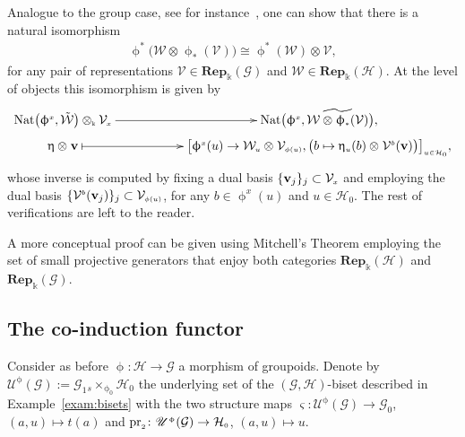 \documentclass[pdftex]{sigma}
\numberwithin{equation}{section}
\newcommand{\tensor}[1]{\otimes_{\scriptscriptstyle{#1}}}
\newcommand{\Rep}[1]{\mathbf{Rep}_{\Sscript{\Bbbk}}(#1)}
\newcommand{\Go}{\cG_{\Sscript{0}}}
\newcommand{\Ga}{\cG_{\Sscript{1}}}
\newcommand{\Ho}{\cH_{\Sscript{0}}}
\newcommand{\Vx}{\cV_{\Sscript{x}}}
\newcommand{\uU}{\mathscr{U}}
\newcommand{\cG}{{\mathcal G}}
\newcommand{\cH}{{\mathcal H}}
\newcommand{\cV}{{\mathcal V}}
\newcommand{\cW}{{\mathcal W}}
\newcommand{\Sscript}[1]{\scriptscriptstyle{#1}}
\newcommand{\due}[3]{{}_{{#2 }} {#1}_{{ #3}} }
\newcommand{\upg}{\uU^{\Sscript{\upphi}}(\cG)}
\begin{document}
\begin{Remark}\label{rem:PFromula}Analogue to the group case, see for instance~\cite[Proposition~2.10.18]{Kowalski:2014}, one can show that there is a natural isomorphism
\begin{gather*}
\upphi^{\Sscript{*}}\big( \cW \tensor{}\upphi_{\Sscript{*}}(\cV)\big) \cong \upphi^{\Sscript{*}}(\cW)\tensor{} \cV,
\end{gather*}
for any pair of representations $\cV \in \Rep{\cG}$ and $\cW \in \Rep{\cH}$. At the level of objects this isomorphism is given by
\begin{gather*}
\xymatrix@R=0pt{ {\rm Nat}\big(\upphi^{\Sscript{x}}, \tilde{\cW}\big) \tensor{\Bbbk} \Vx \ar@{->}^-{}[rr] & & {\rm Nat}\big(\upphi^{\Sscript{x}}, \widetilde{\cW
\tensor{}\upphi_{\Sscript{*}}(\cV)}\big), \\ \upeta\tensor{} {\bf{v}} \ar@{|->}^-{}[rr] & & \big[ \upphi^{\Sscript{x}}(u) \to \cW_{\Sscript{u}}\tensor{}\cV_{\Sscript{\phi(u)}}, \big( b \mapsto \upeta_{\Sscript{u}}(b)\tensor{}\cV^{\Sscript{b}}({\bf{v}})\big) \big]_{\Sscript{u \in \Ho}}, }
\end{gather*}
whose inverse is computed by fixing a dual basis $\{{\bf{v}}_j\}_{j} \subset \Vx$ and employing the dual basis $\{\cV^{\Sscript{b}}({\bf{v}}_j)\}_{j} \subset \cV_{\Sscript{\phi(u)}}$, for any $b \in \upphi^{\Sscript{x}}(u)$ and $u \in \Ho$. The rest of verifications are left to the reader.

A more conceptual proof can be given using Mitchell's Theorem \cite[Theorem 4.5.2]{Mitchell:1965} employing the set of small projective generators that enjoy both categories $\Rep{\cH}$ and $\Rep{\cG}$.
\end{Remark}

\subsection{The co-induction functor}\label{ssec:coInd}
Consider as before $\upphi\colon \cH \to \cG$ a morphism of groupoids. Denote by $\upg:=\Ga \due \times {\Sscript{s}}{ \Sscript{\upphi_0} } \Ho$ the underlying set of the $(\cG,\cH)$-biset described in Example~\ref{exam:bisets} with the two structure maps $ \varsigma\colon \upg \to \Go$, $(a,u) \mapsto t(a)$ and ${\rm pr}_{\Sscript{2}}\colon \upg \to \Ho$, $(a,u) \mapsto u$.
\end{document}
